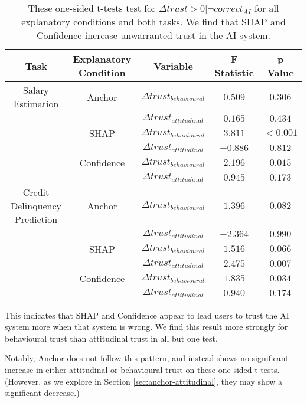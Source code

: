 \begin{table}[htb]
    \caption{These one-sided t-tests test for $\Delta trust > 0 | \neg correct_{AI}$ for all explanatory conditions and both tasks. We find that SHAP and Confidence increase unwarranted trust in the AI system.}
    \label{tab:delta-trust-t}
    \begin{tabular}{ccccc}
        \toprule
        Task & Explanatory Condition & Variable & F Statistic & p Value \\ 
        \midrule
        Salary Estimation & Anchor & $\Delta trust_{behavioural}$ & $0.509$ & $0.306$ \\
        & & $\Delta trust_{attitudinal}$ & $0.165$ & $0.434$ \\
        & SHAP & $\Delta trust_{behavioural}$ & $\mathbf{3.811}$ & $\mathbf{<0.001}$ \\
        & & $\Delta trust_{attitudinal}$ & $-0.886$ & $0.812$ \\
        & Confidence & $\Delta trust_{behavioural}$ & $\mathbf{2.196}$ & $\mathbf{0.015}$ \\
        & & $\Delta trust_{attitudinal}$ & $0.945$ & $0.173$ \\
        \midrule
        Credit Delinquency Prediction & Anchor & $\Delta trust_{behavioural}$ & $1.396$ & $0.082$ \\
        & & $\Delta trust_{attitudinal}$ & $-2.364$ & $0.990$ \\
        & SHAP & $\Delta trust_{behavioural}$ & $1.516$ & $0.066$ \\
        & & $\Delta trust_{attitudinal}$ & $\mathbf{2.475}$ & $\mathbf{0.007}$ \\
        & Confidence & $\Delta trust_{behavioural}$ & $\mathbf{1.835}$ & $\mathbf{0.034}$ \\
        & & $\Delta trust_{attitudinal}$ & $0.940$ & $0.174$ \\
        \bottomrule
    \end{tabular}
\end{table}

This indicates that SHAP and Confidence appear to lead users to trust the AI system more when that system is wrong. We find this result more strongly for behavioural trust than attitudinal trust in all but one test.

Notably, Anchor does not follow this pattern, and instead shows no significant increase in either attitudinal or behavioural trust on these one-sided t-tests. (However, as we explore in Section \ref{sec:anchor-attitudinal}, they may show a significant decrease.)

